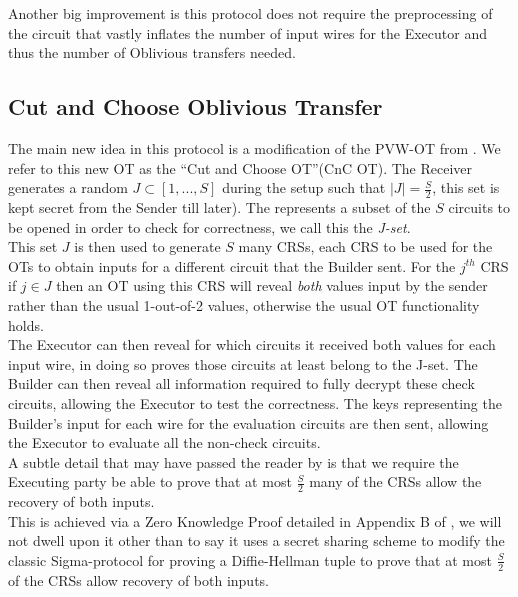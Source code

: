 \documentclass[ %
                    author={Nicholas Tutte},
                supervisor={Prof. Nigel Smart},
                    degree={MEng},
                     title={Secure Two Party Computation},
                  subtitle={A practical comparison of recent protocols},
                      type={Research - GG1K},
                      year={2015} ]{dissertation}
\begin{document}
				Another big improvement is this protocol does not require the preprocessing of the circuit that vastly inflates the number of input wires for the Executor and thus the number of Oblivious transfers needed.

			\subsection{Cut and Choose Oblivious Transfer}
				The main new idea in this protocol is a modification of the PVW-OT from \cite{PVW_OT_2008}. We refer to this new OT as the ``Cut and Choose OT''(CnC OT). The Receiver generates a random $J \subset [1, ..., S]$ during the setup such that $\vert J \vert = \frac{S}{2}$,  this set is kept secret from the Sender till later). The represents a subset of the $S$ circuits to be opened in order to check for correctness, we call this the \emph{J-set}.\\

				This set $J$ is then used to generate $S$ many CRSs, each CRS to be used for the OTs to obtain inputs for a different circuit that the Builder sent. For the $j^{th}$ CRS if $j \in J$ then an OT using this CRS will reveal \emph{both} values input by the sender rather than the usual 1-out-of-2 values, otherwise the usual OT functionality holds.\\

				The Executor can then reveal for which circuits it received both values for each input wire, in doing so proves those circuits at least belong to the J-set. The Builder can then reveal all information required to fully decrypt these check circuits, allowing the Executor to test the correctness. The keys representing the Builder's input for each wire for the evaluation circuits are then sent, allowing the Executor to evaluate all the non-check circuits.\\

				A subtle detail that may have passed the reader by is that we require the Executing party be able to prove that at most $\frac{S}{2}$ many of the CRSs allow the recovery of both inputs.\\ 

				This is achieved via a Zero Knowledge Proof detailed in Appendix B of \cite{LindellAndPinkas2011}, we will not dwell upon it other than to say it uses a secret sharing scheme to modify the classic Sigma-protocol for proving a Diffie-Hellman tuple to prove that at most $\frac{S}{2}$ of the CRSs allow recovery of both inputs.\\
\end{document}
